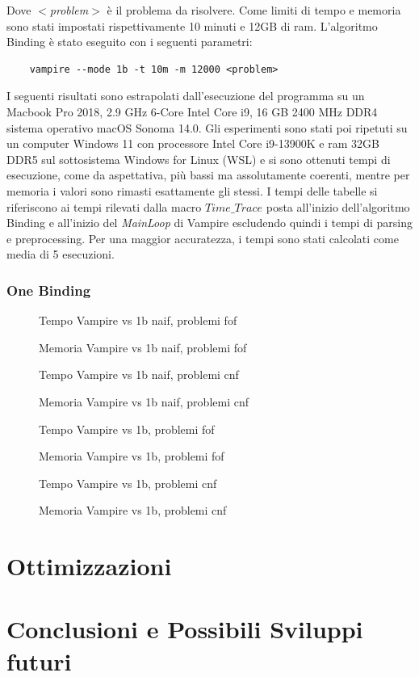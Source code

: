 \documentclass[./main.tex]{subfiles}
\newcommand{\grafico}[3]{
    \begin{figure}[H]
        \centering
        \scalebox{0.7}{
            \texttt{[image: \#1]}
        }
        \caption{#2}
        \label{#3}
    \end{figure}
}
\begin{document}
Dove \textit{$<$problem$>$} è il problema da risolvere. 
Come limiti di tempo e memoria sono stati impostati rispettivamente 10 minuti e 12GB di ram.
L'algoritmo Binding è stato eseguito con i seguenti parametri:
\begin{verbatim}
    vampire --mode 1b -t 10m -m 12000 <problem>
\end{verbatim}
I seguenti risultati sono estrapolati dall'esecuzione del programma su un 
Macbook Pro 2018, 2.9 GHz 6-Core Intel Core i9, 16 GB 2400 MHz DDR4 sistema operativo macOS Sonoma 14.0.
Gli esperimenti sono stati poi ripetuti su un computer Windows 11 con processore Intel Core i9-13900K e ram 32GB DDR5
sul sottosistema Windows for Linux (WSL) e si sono ottenuti tempi di esecuzione, come da aspettativa, più bassi ma assolutamente coerenti,
mentre per memoria i valori sono rimasti esattamente gli stessi.
I tempi delle tabelle si riferiscono ai tempi rilevati dalla macro $Time\_Trace$ posta all'inizio dell'algoritmo Binding 
e all'inizio del \textit{MainLoop} di Vampire escludendo quindi i tempi di parsing e preprocessing.
Per una maggior accuratezza, i tempi sono stati calcolati come media di 5 esecuzioni.

\subsubsection{One Binding}

\grafico{images/5_sperimentazione/time/1b/fof_1b_naif.png}{Tempo Vampire vs 1b naif, problemi fof}{fig:fof_1b_naif}
\grafico{images/5_sperimentazione/mem/1b/fof_naif_mem.png}{Memoria Vampire vs 1b naif, problemi fof}{fig:fof_1b_naif_mem}

\grafico{images/5_sperimentazione/time/1b/cnf_1b_naif.png}{Tempo Vampire vs 1b naif, problemi cnf}{fig:cnf_1b_naif}
\grafico{images/5_sperimentazione/mem/1b/cnf_naif_1b_mem_.png}{Memoria Vampire vs 1b naif, problemi cnf}{fig:cnf_1b_naif}

\grafico{images/5_sperimentazione/time/1b/fof_1b.png}{Tempo Vampire vs 1b, problemi fof}{fig:fof_1b}
\grafico{images/5_sperimentazione/mem/1b/fof_mem.png}{Memoria Vampire vs 1b, problemi fof}{fig:fof_1b}

\grafico{images/5_sperimentazione/time/1b/cnf_1b.png}{Tempo Vampire vs 1b, problemi cnf}{fig:cnf_1b}
\grafico{images/5_sperimentazione/mem/1b/cnf_1b_mem.png}{Memoria Vampire vs 1b, problemi cnf}{fig:cnf_1b}




\section{Ottimizzazioni}
\section{Conclusioni e Possibili Sviluppi futuri}
\end{document}
